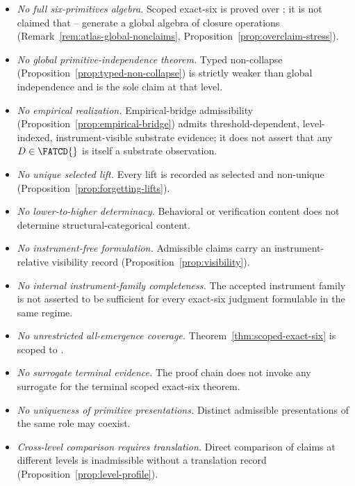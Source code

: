 \begin{itemize}[topsep=2pt,itemsep=1pt]
  \item \emph{No full six-primitives algebra.} Scoped exact-six is
    proved over \FATCD{}; it is not claimed that \Pone{}--\Psix{}
    generate a global algebra of closure operations
    (Remark~\ref{rem:atlas-global-nonclaims},
    Proposition~\ref{prop:overclaim-stress}).
  \item \emph{No global primitive-independence theorem.} Typed
    non-collapse (Proposition~\ref{prop:typed-non-collapse}) is
    strictly weaker than global independence and is the sole claim at
    that level.
  \item \emph{No empirical realization.} Empirical-bridge admissibility
    (Proposition~\ref{prop:empirical-bridge}) admits
    threshold-dependent, level-indexed, instrument-visible substrate
    evidence; it does not assert that any \(D \in \FATCD{}\) is itself
    a substrate observation.
  \item \emph{No unique selected lift.} Every lift is recorded as
    selected and non-unique
    (Proposition~\ref{prop:forgetting-lifts}).
  \item \emph{No lower-to-higher determinacy.} Behavioral or
    verification content does not determine structural-categorical
    content.
  \item \emph{No instrument-free formulation.} Admissible claims carry
    an instrument-relative visibility record
    (Proposition~\ref{prop:visibility}).
  \item \emph{No internal instrument-family completeness.} The
    accepted instrument family is not asserted to be sufficient for
    every exact-six judgment formulable in the same regime.
  \item \emph{No unrestricted all-emergence coverage.}
    Theorem~\ref{thm:scoped-exact-six} is scoped to \FATCD{}.
  \item \emph{No surrogate terminal evidence.} The proof chain does
    not invoke any surrogate for the terminal scoped exact-six
    theorem.
  \item \emph{No uniqueness of primitive presentations.} Distinct
    admissible presentations of the same role may coexist.
  \item \emph{Cross-level comparison requires translation.} Direct
    comparison of claims at different levels is inadmissible without a
    translation record (Proposition~\ref{prop:level-profile}).
\end{itemize}

